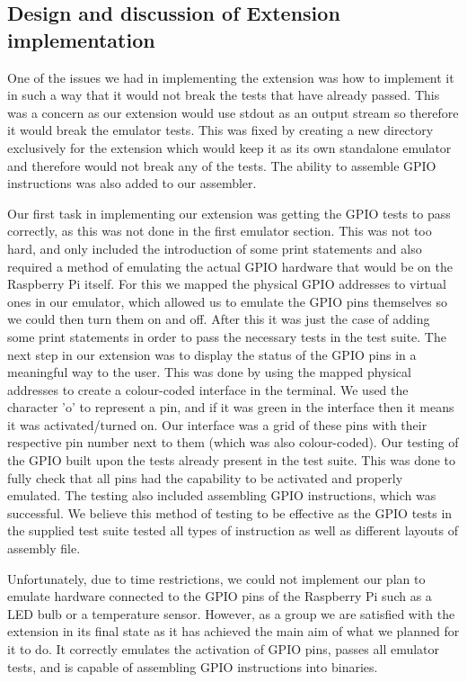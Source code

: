\documentclass[11pt]{article}
\begin{document}
\subsection{Design and discussion of Extension implementation}
One of the issues we had in implementing the extension was how to implement it in such a way that it would not break the tests that have already passed. This was a concern as our extension would use stdout as an output stream so therefore it would break the emulator tests. This was fixed by creating a new directory exclusively for the extension which would keep it as its own standalone emulator and therefore would not break any of the tests. The ability to assemble GPIO instructions was also added to our assembler.
\par
Our first task in implementing our extension was getting the GPIO tests to pass correctly, as this was not done in the first emulator section. This was not too hard, and only included the introduction of some print statements and also required a method of emulating the actual GPIO hardware that would be on the Raspberry Pi itself. For this we mapped the physical GPIO addresses to virtual ones in our emulator, which allowed us to emulate the GPIO pins themselves so we could then turn them on and off. After this it was just the case of adding some print statements in order to pass the necessary tests in the test suite. The next step in our extension was to display the status of the GPIO pins in a meaningful way to the user. This was done by using the mapped physical addresses to create a colour-coded interface in the terminal. We used the character 'o' to represent a pin, and if it was green in the interface then it means it was activated/turned on. Our interface was a grid of these pins with their respective pin number next to them (which was also colour-coded). Our testing of the GPIO built upon the tests already present in the test suite. This was done to fully check that all pins had the capability to be activated and properly emulated. The testing also included assembling GPIO instructions, which was successful. We believe this method of testing to be effective as the GPIO tests in the supplied test suite tested all types of instruction as well as different layouts of assembly file.
\par
Unfortunately, due to time restrictions, we could not implement our plan to emulate hardware connected to the GPIO pins of the Raspberry Pi such as a LED bulb or a temperature sensor. However, as a group we are satisfied with the extension in its final state as it has achieved the main aim of what we planned for it to do. It correctly emulates the activation of GPIO pins, passes all emulator tests, and is capable of assembling GPIO instructions into binaries.
\end{document}
